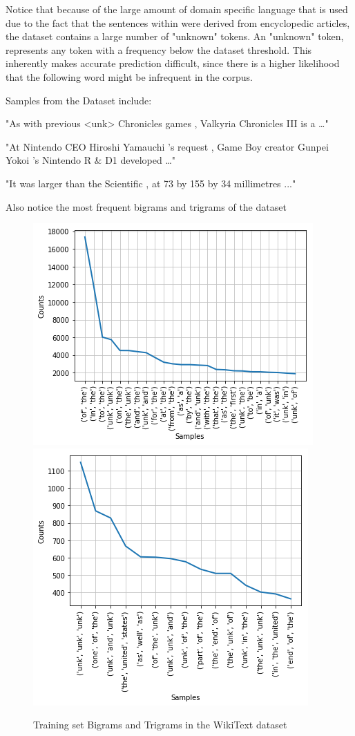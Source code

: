 \documentclass[a4paper]{article}
\begin{document}
Notice that because of the large amount of domain specific language that is used
due to the fact that the sentences within were derived from encyclopedic
articles, the dataset contains a large number of "unknown" tokens. An "unknown"
token, represents any token with a frequency below the dataset threshold. This
inherently makes accurate prediction difficult, since there is a higher
likelihood that the following word might be infrequent in the corpus.

Samples from the Dataset include:

"As with previous <unk> Chronicles games , Valkyria Chronicles III is a …"

"At Nintendo CEO Hiroshi Yamauchi 's request , Game Boy creator Gunpei Yokoi 's Nintendo R \& D1 developed …"

"It was larger than the Scientific , at 73 by 155 by 34 millimetres ..."

Also notice the most frequent bigrams and trigrams of the dataset

\begin{figure}[!ht]
\includegraphics[width=0.7\columnwidth]{sr-eda-wikitext-bigrams}
\includegraphics[width=0.7\columnwidth]{sr-eda-wikitext-trigrams}
\centering
\caption{Training set Bigrams and Trigrams in the WikiText dataset}
\end{figure}
\end{document}
